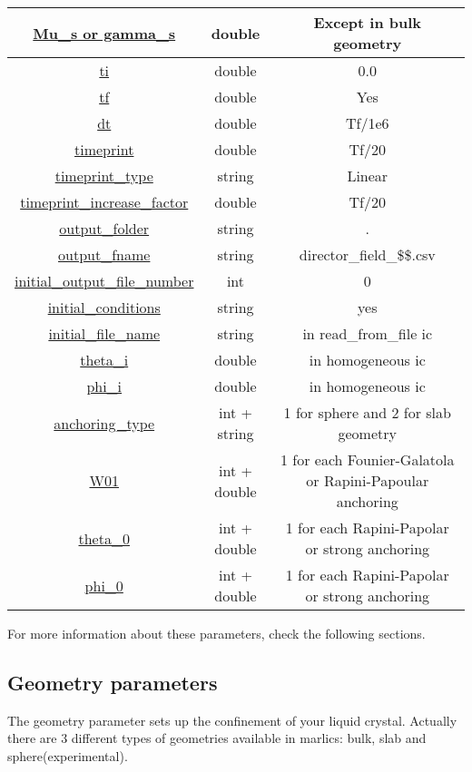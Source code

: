 \documentclass{article}
\begin{document}
\begin{center}
\begin{longtable}{|c|c|c|}
		\hyperref[lc.param]{Mu\_s or gamma\_s} & double & Except in bulk geometry \\ 
		\hline 
		\hyperref[time.param]{ti}& double & 0.0 \\ 
		\hline 
		\hyperref[time.param]{tf}& double & Yes\\ 
		\hline 
		\hyperref[time.param]{dt} &	double & Tf/1e6 \\ 
		\hline 
		\hyperref[snapshot.param]{timeprint}&	double &  Tf/20 \\ 
		\hline 
		\hyperref[snapshot.param]{timeprint\_type}& string & Linear\\ 
		\hline 
		\hyperref[snapshot.param]{timeprint\_increase\_factor}& double & Tf/20 \\ 
		\hline 
		\hyperref[snapshot.param]{output\_folder}&	string & . \\ 
		\hline 
		\hyperref[snapshot.param]{output\_fname}&	string & director\_field\_\$\$.csv \\ 
		\hline 
		\hyperref[snapshot.param]{initial\_output\_file\_number} &	int & 0 \\ 
		\hline 
		\hyperref[ic.param]{initial\_conditions} & string & yes \\ 
		\hline 
		\hyperref[ic.param]{initial\_file\_name} & string & in read\_from\_file ic \\ 
		\hline 
		\hyperref[ic.param]{theta\_i} &	double & in homogeneous ic \\ 
		\hline 
		\hyperref[ic.param]{phi\_i} &	double & in homogeneous ic\\ 
		\hline 
		\hyperref[boundary.params]{anchoring\_type} & int + string & 1 for sphere and 2 for slab geometry\\ 
		\hline 
		\hyperref[boundary.params]{W01}& int + double & 1 for each Founier-Galatola or Rapini-Papoular anchoring\\ 
		\hline 
		\hyperref[boundary.params]{theta\_0} &  int + double  & 1 for each Rapini-Papolar or strong anchoring \\ 
		\hline 
		\hyperref[boundary.params]{phi\_0} &	 int + double  & 1 	for each Rapini-Papolar or strong anchoring \\ 
		\hline 
	\end{longtable} 
\end{center}

For more information about these parameters, check the following sections.


\subsection{Geometry parameters}\label{geometry}
The geometry parameter sets up the confinement of your liquid crystal. Actually there are 3 different types of geometries available in marlics: bulk, slab and sphere(experimental).
\end{document}
